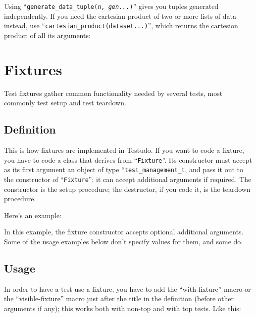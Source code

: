\documentclass[twoside, a4paper, article]{memoir}
\newcommand\typesetexample[1]{%
  \typesetexamplesource{#1}
}
\newcommand\typesetexampleandreport[1]{%
  \typesetexamplesource{#1}
  \typesetexamplereport{#1}
}
\providecommand\typesetexamplereport[1]{%
}
\providecommand\typesetexamplesource[1]{%
}
\begin{document}
\typesetexampleandreport{generate-data-tuple}

Using ``\texttt{generate\_data\_tuple(\textit{n}, \textit{gen...})}'' gives you
tuples generated independently.  If you need the cartesian product of two or
more lists of data instead, use ``\texttt{cartesian\_product(dataset...)}'',
which returns the cartesion product of all its arguments:

\typesetexampleandreport{cartesian-product}


\chapter{Fixtures}
\label{cha:fixtures}

Test fixtures gather common functionality needed by several tests, most
commonly test setup and test teardown.

\section{Definition}
\label{sec:fixture-definition}

This is how fixtures are implemented in Testudo.  If you want to code a
fixture, you have to code a class that derives from ``\texttt{Fixture}''.  Its
constructor must accept as its first argument an object of type
``\texttt{test\_management\_t}, and pass it out to the constructor of
``\texttt{Fixture}''; it can accept additional arguments if required.  The
constructor is the setup procedure; the destructor, if you code it, is the
teardown procedure.

Here's an example:

\typesetexample{fixture-outatime-definition}

In this example, the fixture constructor accepts optional additional arguments.
Some of the usage examples below don't specify values for them, and some do.

\section{Usage}
\label{sec:fixture-usage}

In order to have a test use a fixture, you have to add the ``with-fixture''
macro or the ``visible-fixture'' macro just after the title in the definition
(before other arguments if any); this works both with non-top and with top
tests.  Like this:

\typesetexampleandreport{fixture-outatime-test}
\end{document}
